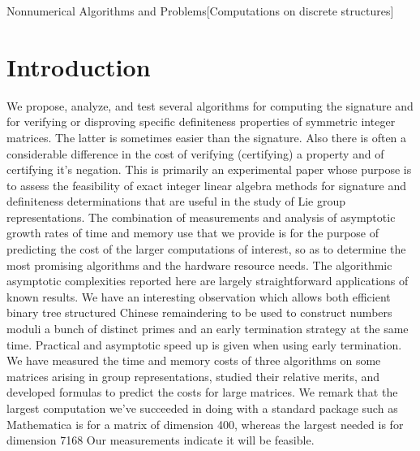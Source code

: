 \documentclass{sig-alternate}
\begin{document}
{Nonnumerical Algorithms and Problems}[Computations on discrete structures]



\section{Introduction}

We propose, analyze, and test several algorithms for 
computing the signature and for verifying or disproving specific
definiteness properties of symmetric integer matrices.  
The latter is sometimes easier than the signature.  
Also there is often a considerable difference in the 
cost of verifying (certifying) a property and of certifying it's negation.
This is primarily an experimental paper whose purpose is to assess the feasibility 
of exact integer linear algebra methods for signature and definiteness determinations
that are useful in the study of Lie group representations.
The combination of measurements and analysis of asymptotic growth rates of time
and memory use that we provide is for the purpose of predicting the cost of the larger
computations of interest, so as to determine the most promising algorithms and the 
hardware resource needs.
The algorithmic asymptotic complexities reported here are largely straightforward 
applications of known results. 
We have an interesting observation which
allows both efficient binary tree structured Chinese remaindering to be used to construct 
numbers moduli a bunch of distinct primes and an early termination strategy at the same time.
Practical and asymptotic speed up is given when using early termination.
We have measured the time and memory costs of three algorithms on some matrices arising
in group representations, 
studied their relative merits, and developed formulas to predict the costs for large matrices.
We remark that the largest computation we've succeeded in doing with
a standard package such as Mathematica is for a matrix of dimension
400, whereas the largest needed is for dimension 7168  Our measurements 
indicate it will be feasible.
\end{document}
